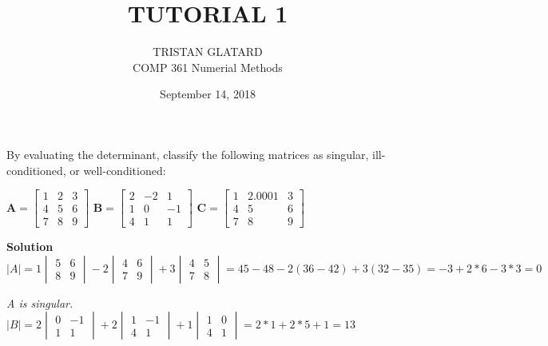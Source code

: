 \title{TUTORIAL 1}%
\author{TRISTAN GLATARD\\ %
COMP 361 Numerial Methods} %
\date{September 14, 2018} 
\maketitle

\begin{exercise}{1} %
By evaluating the determinant, classify the following matrices as singular, ill-conditioned, or well-conditioned:\\
\begin{center}

$\textbf{A}= 
\begin{bmatrix}
1&2&3 \\4&5&6 \\ 7&8&9
\end{bmatrix}$
$\textbf{B}= 
\begin{bmatrix}
2&-2&1 \\1&0&-1 \\ 4&1&1
\end{bmatrix}$
$\textbf{C}= 
\begin{bmatrix}
1&2.0001&3 \\4&5&6 \\ 7&8&9
\end{bmatrix}$
\end{center}
\textbf{Solution}\\

$
\vert A \vert = 1 
\begin{vmatrix}
5&6 \\ 8&9
\end{vmatrix} - 2
\begin{vmatrix}
4&6 \\ 7&9
\end{vmatrix} + 3
\begin{vmatrix}
4&5 \\ 7&8
\end{vmatrix} = 45 - 48 - 2 (36-42) + 3 (32 - 35) = -3 + 2*6 - 3*3 = 0 
$ 

\textit{A is singular.} \\

$
\vert B \vert = 2 
\begin{vmatrix}
0&-1 \\ 1&1
\end{vmatrix} + 2
\begin{vmatrix}
1&-1 \\ 4&1
\end{vmatrix} + 1
\begin{vmatrix}
1&0\\4&1
\end{vmatrix}=2*1+2*5+1=13
$ \\


\end{exercise}
